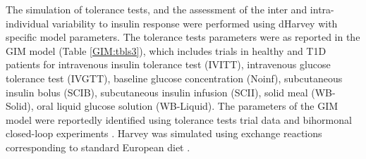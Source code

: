 The simulation of tolerance tests, and the assessment of the inter and intra-individual variability to insulin response were performed using dHarvey with specific model parameters. The tolerance tests parameters were as reported in the GIM model \cite{schaller2013generic} (Table \ref{GIM:tbls3}), which includes trials in healthy and T1D patients for intravenous insulin tolerance test (IVITT), intravenous glucose tolerance test (IVGTT), baseline glucose concentration (Noinf), subcutaneous insulin bolus (SCIB), subcutaneous insulin infusion (SCII), solid meal (WB-Solid), oral liquid glucose solution (WB-Liquid). The parameters of the GIM model were reportedly \cite{schaller2013generic} identified using tolerance tests trial data \cite{sorensen1985physiologic,regittnig1999plasma} and bihormonal closed-loop experiments \cite{el2010bihormonal}. Harvey was simulated using exchange reactions corresponding to standard European diet \cite{sahoo2013predicting}.

